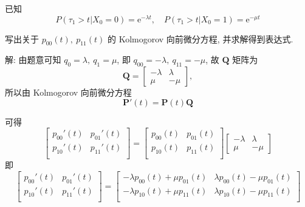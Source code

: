 \documentclass[openany]{ctexbook}
\theoremstyle{kaiti}
\theoremstyle{normal}
\begin{document}
已知
\begin{equation}
  P(\tau_1>t|X_0=0)=\mathrm{e}^{-\lambda t},\quad P(\tau_1>t|X_0=1)=\mathrm{e}^{-\mu t}
\end{equation}

写出关于 $p_{00}(t),~p_{11}(t)$ 的 Kolmogorov 向前微分方程, 并求解得到表达式.

解: 由题意可知 $q_0=\lambda,~q_1=\mu$, 即 $q_{00}=-\lambda,~q_{11}=-\mu$, 故 $\bm{Q}$ 矩阵为
\begin{equation}
  \bm{Q}=
  \begin{bmatrix}
    -\lambda & \lambda \\
    \mu & -\mu
  \end{bmatrix},
\end{equation}
所以由 Kolmogorov 向前微分方程
\begin{equation}
  \bm{P}'(t)=\bm{P}(t)\bm{Q}
\end{equation}

可得
\begin{equation}
  \begin{bmatrix}
    p_{00}'(t) & p_{01}'(t) \\
    p_{10}'(t) & p_{11}'(t) \\
  \end{bmatrix}
  =\begin{bmatrix}
    p_{00}(t) & p_{01}(t) \\
    p_{10}(t) & p_{11}(t) \\
  \end{bmatrix}
  \begin{bmatrix}
    -\lambda & \lambda \\
    \mu & -\mu
  \end{bmatrix}
\end{equation}
即
\begin{equation}
  \begin{bmatrix}
    p_{00}'(t) & p_{01}'(t) \\
    p_{10}'(t) & p_{11}'(t) \\
  \end{bmatrix}
  =\begin{bmatrix}
    -\lambda p_{00}(t)+\mu p_{01}(t) & \lambda p_{00}(t)-\mu p_{01}(t) \\
    -\lambda p_{10}(t)+\mu p_{11}(t) & \lambda p_{10}(t)-\mu p_{11}(t) \\
  \end{bmatrix}
\end{equation}
\end{document}
